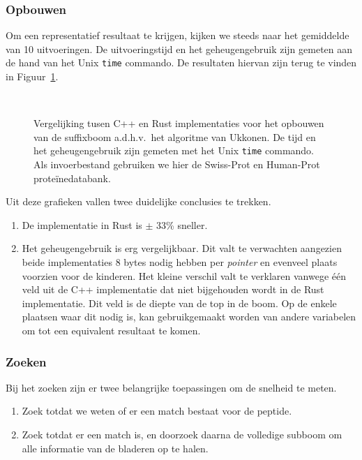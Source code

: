 \subsubsection{Opbouwen}
Om een representatief resultaat te krijgen, kijken we steeds naar het gemiddelde van 10 uitvoeringen.
De uitvoeringstijd en het geheugengebruik zijn gemeten aan de hand van het Unix \texttt{time} commando.
De resultaten hiervan zijn terug te vinden in Figuur~\ref{fig:tree_building}.
\begin{figure}[H]
    \centering
    \\[4ex] %

    \caption{Vergelijking tusen C++ en Rust implementaties voor het opbouwen van de suffixboom a.d.h.v.~het algoritme van Ukkonen. De tijd en het geheugengebruik zijn gemeten met het Unix \texttt{time} commando. Als invoerbestand gebruiken we hier de Swiss-Prot en Human-Prot proteïnedatabank.}\label{fig:tree_building}
\end{figure}

Uit deze grafieken vallen twee duidelijke conclusies te trekken.
\begin{enumerate}
    \item De implementatie in Rust is $\pm$ 33\% sneller.
    \item Het geheugengebruik is erg vergelijkbaar.
    Dit valt te verwachten aangezien beide implementaties 8 bytes nodig hebben per \textit{pointer} en evenveel plaats voorzien voor de kinderen.
    Het kleine verschil valt te verklaren vanwege één veld uit de C++ implementatie dat niet bijgehouden wordt in de Rust implementatie.
    Dit veld is de diepte van de top in de boom.
    Op de enkele plaatsen waar dit nodig is, kan gebruikgemaakt worden van andere variabelen om tot een equivalent resultaat te komen.
\end{enumerate}

\subsubsection{Zoeken}
Bij het zoeken zijn er twee belangrijke toepassingen om de snelheid te meten.
\begin{enumerate}
    \item Zoek totdat we weten of er een match bestaat voor de peptide.
    \item Zoek totdat er een match is, en doorzoek daarna de volledige subboom om alle informatie van de bladeren op te halen.

\end{enumerate}

